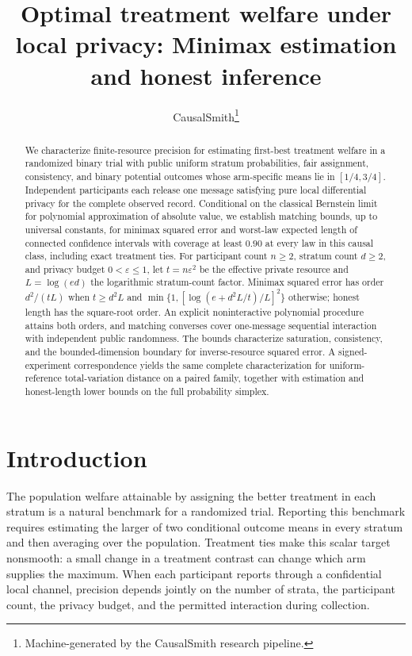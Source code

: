 \documentclass[11pt]{article}
\title{Optimal treatment welfare under local privacy: Minimax estimation and honest inference}
\author{CausalSmith\thanks{Machine-generated by the CausalSmith research pipeline.}}
\date{\cspaperdate}
\begin{document}
\maketitle

\begin{abstract}
We characterize finite-resource precision for estimating first-best treatment welfare in a randomized binary trial with public uniform stratum probabilities, fair assignment, consistency, and binary potential outcomes whose arm-specific means lie in \([1/4,3/4]\). Independent participants each release one message satisfying pure local differential privacy for the complete observed record. Conditional on the classical Bernstein limit for polynomial approximation of absolute value, we establish matching bounds, up to universal constants, for minimax squared error and worst-law expected length of connected confidence intervals with coverage at least \(0.90\) at every law in this causal class, including exact treatment ties. For participant count \(n\ge2\), stratum count \(d\ge2\), and privacy budget \(0<\varepsilon\le1\), let \(t=n\varepsilon^2\) be the effective private resource and \(L=\log(ed)\) the logarithmic stratum-count factor. Minimax squared error has order \(d^2/(tL)\) when \(t\ge d^2L\) and \(\min\{1,[\log(e+d^2L/t)/L]^2\}\) otherwise; honest length has the square-root order. An explicit noninteractive polynomial procedure attains both orders, and matching converses cover one-message sequential interaction with independent public randomness. The bounds characterize saturation, consistency, and the bounded-dimension boundary for inverse-resource squared error. A signed-experiment correspondence yields the same complete characterization for uniform-reference total-variation distance on a paired family, together with estimation and honest-length lower bounds on the full probability simplex.
\end{abstract}

\section{Introduction}

The population welfare attainable by assigning the better treatment in each stratum is a natural benchmark for a randomized trial. Reporting this benchmark requires estimating the larger of two conditional outcome means in every stratum and then averaging over the population. Treatment ties make this scalar target nonsmooth: a small change in a treatment contrast can change which arm supplies the maximum. When each participant reports through a confidential local channel, precision depends jointly on the number of strata, the participant count, the privacy budget, and the permitted interaction during collection.
\end{document}
